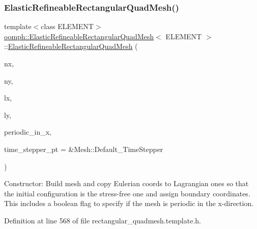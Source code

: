 \subsubsection{\texorpdfstring{Elastic\+Refineable\+Rectangular\+Quad\+Mesh()}{ElasticRefineableRectangularQuadMesh()}\hspace{0.1cm}{\footnotesize\ttfamily [2/3]}}
{\footnotesize\ttfamily template$<$class E\+L\+E\+M\+E\+NT$>$ \\
\hyperlink{classoomph_1_1ElasticRefineableRectangularQuadMesh}{oomph\+::\+Elastic\+Refineable\+Rectangular\+Quad\+Mesh}$<$ E\+L\+E\+M\+E\+NT $>$\+::\hyperlink{classoomph_1_1ElasticRefineableRectangularQuadMesh}{Elastic\+Refineable\+Rectangular\+Quad\+Mesh} (\begin{DoxyParamCaption}\item[{const unsigned \&}]{nx,  }\item[{const unsigned \&}]{ny,  }\item[{const double \&}]{lx,  }\item[{const double \&}]{ly,  }\item[{const bool \&}]{periodic\+\_\+in\+\_\+x,  }\item[{Time\+Stepper $\ast$}]{time\+\_\+stepper\+\_\+pt = {\ttfamily \&Mesh\+:\+:Default\+\_\+TimeStepper} }\end{DoxyParamCaption})\hspace{0.3cm}{\ttfamily [inline]}}



Constructor\+: Build mesh and copy Eulerian coords to Lagrangian ones so that the initial configuration is the stress-\/free one and assign boundary coordinates. This includes a boolean flag to specify if the mesh is periodic in the x-\/direction. 



Definition at line 568 of file rectangular\+\_\+quadmesh.\+template.\+h.

\mbox{\label{classoomph_1_1ElasticRefineableRectangularQuadMesh_a1cea0e91f2d8687182a8f5de6737a511}} 
